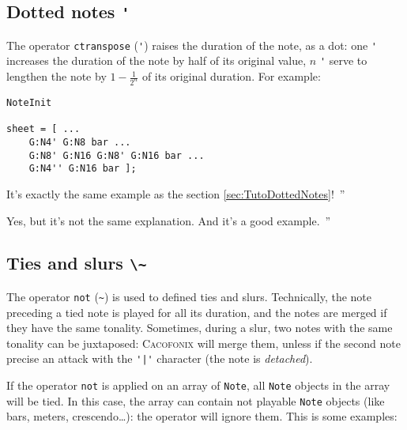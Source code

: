\documentclass{article}
\newcommand{\cacofonix}{\textsc{Cacofonix}\xspace}
\newcommand{\note}{\lstinline!Note!\xspace}
\newenvironment{meenv}{ \par \noindent \makebox[6em][r]{ \textcolor{mecolor}{Me}: `` --~}}{~''}
\newenvironment{myselfenv}{ \par \noindent \makebox[6em][r]{ \textcolor{myselfcolor}{Myself}: `` --~}}{~''}
\newcommand{\me}[1]{\begin{meenv}#1\end{meenv}}
\newcommand{\myself}[1]{\begin{myselfenv}#1\end{myselfenv}}
\begin{document}
\subsection{Dotted notes \lstinline!'!}
\label{sec:DottedNotes}

The operator \lstinline!ctranspose! (\lstinline!'!) raises the duration of the note, as a dot: one \lstinline!'! increases the duration of the note by half of its original value, $n$ \lstinline!'! serve to lengthen the note by $1 - \frac{1}{2^n}$ of its original duration. For example: \\

\begin{lstlisting}
NoteInit

sheet = [ ...
	G:N4' G:N8 bar ...
	G:N8' G:N16 G:N8' G:N16 bar ...
	G:N4'' G:N16 bar ];
\end{lstlisting}

\me{It's exactly the same example as the section \ref{sec:TutoDottedNotes}!}
\myself{Yes, but it's not the same explanation. And it's a good example.}

\subsection{Ties and slurs \lstinline!\~!}
\label{sec:TiesAndSlurs}

The operator \lstinline!not! (\lstinline!~!) is used to defined ties and slurs. Technically, the note preceding a tied note is played for all its duration, and the notes are merged if they have the same tonality. Sometimes, during a slur, two notes with the same tonality can be juxtaposed: \cacofonix will merge them, unless if the second note precise an attack with the \lstinline!'|'! character (the note is \emph{detached}).

If the operator \lstinline!not! is applied on an array of \note, all \note objects in the array will be tied. In this case, the array can contain not playable \note objects (like bars, meters, crescendo\dots): the operator will ignore them. This is some examples: \\
\end{document}
